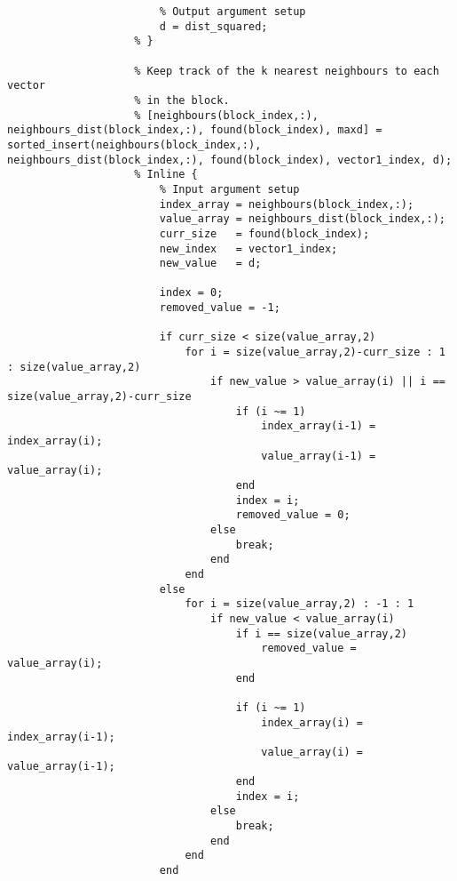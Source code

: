 \begin{lstlisting}
                        % Output argument setup
                        d = dist_squared;
                    % }

                    % Keep track of the k nearest neighbours to each vector
                    % in the block.
                    % [neighbours(block_index,:), neighbours_dist(block_index,:), found(block_index), maxd] = sorted_insert(neighbours(block_index,:), neighbours_dist(block_index,:), found(block_index), vector1_index, d);
                    % Inline {
                        % Input argument setup
                        index_array = neighbours(block_index,:);
                        value_array = neighbours_dist(block_index,:);
                        curr_size   = found(block_index);
                        new_index   = vector1_index;
                        new_value   = d;

                        index = 0;
                        removed_value = -1;

                        if curr_size < size(value_array,2)
                            for i = size(value_array,2)-curr_size : 1 : size(value_array,2)
                                if new_value > value_array(i) || i == size(value_array,2)-curr_size
                                    if (i ~= 1)
                                        index_array(i-1) = index_array(i);
                                        value_array(i-1) = value_array(i);
                                    end
                                    index = i;
                                    removed_value = 0;
                                else
                                    break;
                                end
                            end
                        else
                            for i = size(value_array,2) : -1 : 1
                                if new_value < value_array(i)
                                    if i == size(value_array,2)
                                        removed_value = value_array(i);
                                    end

                                    if (i ~= 1)
                                        index_array(i) = index_array(i-1);
                                        value_array(i) = value_array(i-1);
                                    end
                                    index = i;
                                else
                                    break;
                                end
                            end
                        end


\end{lstlisting}
